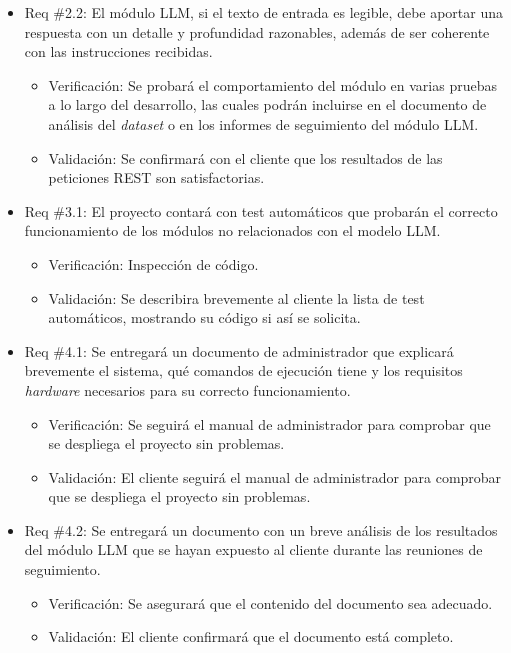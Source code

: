 \documentclass[
11pt, %
]{Clases/charter}
\begin{document}
\begin{itemize}
	\item Req \#2.2: El módulo LLM, si el texto de entrada es legible, debe aportar una respuesta con un detalle y profundidad razonables,
	      además de ser coherente con las instrucciones recibidas.
	      \begin{itemize}
		      \item Verificación: Se probará el comportamiento del módulo en varias pruebas a lo largo del desarrollo,
		            las cuales podrán incluirse en el documento de análisis del \textit{dataset} o en los informes de seguimiento del módulo LLM.
		      \item Validación: Se confirmará con el cliente que los resultados de las peticiones REST son satisfactorias.
	      \end{itemize}

	\item Req \#3.1: El proyecto contará con test automáticos que probarán el correcto funcionamiento de los módulos no relacionados con el modelo LLM.
	      \begin{itemize}
		      \item Verificación: Inspección de código.
		      \item Validación: Se describira brevemente al cliente la lista de test automáticos, mostrando su código si así se solicita.
	      \end{itemize}

	\item Req \#4.1: Se entregará un documento de administrador que explicará brevemente el sistema, qué comandos de ejecución tiene y los requisitos \textit{hardware} necesarios para su correcto funcionamiento.
	      \begin{itemize}
		      \item Verificación: Se seguirá el manual de administrador para comprobar que se despliega el proyecto sin problemas.
		      \item Validación: El cliente seguirá el manual de administrador para comprobar que se despliega el proyecto sin problemas.
	      \end{itemize}

	\item Req \#4.2: Se entregará un documento con un breve análisis de los resultados del módulo LLM que se hayan expuesto al cliente durante las reuniones de seguimiento.
	      \begin{itemize}
		      \item Verificación: Se asegurará que el contenido del documento sea adecuado.
		      \item Validación: El cliente confirmará que el documento está completo.
	      \end{itemize}


\end{itemize}
\end{document}
